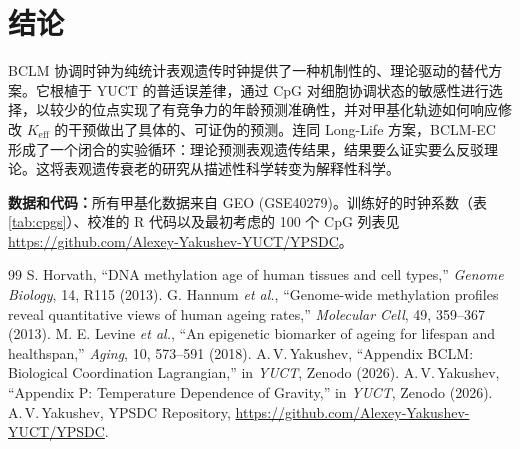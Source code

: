 \documentclass[12pt,a4paper,fontset=fandol]{ctexart}
\begin{document}
	\section{结论}
	\label{sec:conclusion}
	BCLM 协调时钟为纯统计表观遗传时钟提供了一种机制性的、理论驱动的替代方案。它根植于 YUCT 的普适误差律，通过 CpG 对细胞协调状态的敏感性进行选择，以较少的位点实现了有竞争力的年龄预测准确性，并对甲基化轨迹如何响应修改 \(K_{\mathrm{eff}}\) 的干预做出了具体的、可证伪的预测。连同 Long-Life 方案，BCLM-EC 形成了一个闭合的实验循环：理论预测表观遗传结果，结果要么证实要么反驳理论。这将表观遗传衰老的研究从描述性科学转变为解释性科学。
	
	\vspace{0.5cm}
	\noindent\textbf{数据和代码：}所有甲基化数据来自 GEO (GSE40279)。训练好的时钟系数（表 \ref{tab:cpgs}）、校准的 R 代码以及最初考虑的 100 个 CpG 列表见 \url{https://github.com/Alexey-Yakushev-YUCT/YPSDC}。
	
	\begin{thebibliography}{99}
		 S. Horvath, ``DNA methylation age of human tissues and cell types,'' \emph{Genome Biology}, 14, R115 (2013).
		 G. Hannum \emph{et al.}, ``Genome-wide methylation profiles reveal quantitative views of human ageing rates,'' \emph{Molecular Cell}, 49, 359--367 (2013).
		 M. E. Levine \emph{et al.}, ``An epigenetic biomarker of ageing for lifespan and healthspan,'' \emph{Aging}, 10, 573--591 (2018).
		 A.\,V.\,Yakushev, ``Appendix BCLM: Biological Coordination Lagrangian,'' in \emph{YUCT}, Zenodo (2026).
		 A.\,V.\,Yakushev, ``Appendix P: Temperature Dependence of Gravity,'' in \emph{YUCT}, Zenodo (2026).
		 A.\,V.\,Yakushev, YPSDC Repository, \url{https://github.com/Alexey-Yakushev-YUCT/YPSDC}.
	\end{thebibliography}
	
\end{document}
